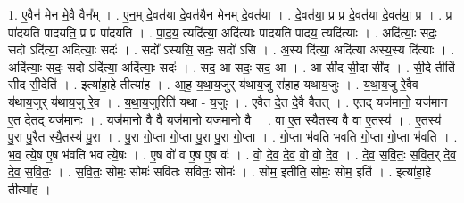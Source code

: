 \documentclass[17pt]{extarticle}
\begin{document}
1. ए॒वैन॑ मेन मे॒वै वैन᳚म् । . ए॒न॒म् दे॒वत॑या दे॒वत॑यैन मेनम् दे॒वत॑या । . दे॒वत॑या॒ प्र प्र दे॒वत॑या दे॒वत॑या॒ प्र । . प्र पा॑दयति पादयति॒ प्र प्र पा॑दयति । . पा॒द॒य॒ त्यदि॑त्या॒ अदि॑त्याः पादयति पादय॒ त्यदि॑त्याः । . अदि॑त्याः॒ सदः॒ सदो ऽदि॑त्या॒ अदि॑त्याः॒ सदः॑ । . सदो᳚ ऽस्यसि॒ सदः॒ सदो॑ ऽसि । . अ॒स्य दि॑त्या॒ अदि॑त्या अस्य॒स्य दि॑त्याः । . अदि॑त्याः॒ सदः॒ सदो ऽदि॑त्या॒ अदि॑त्याः॒ सदः॑ । . सद॒ आ सदः॒ सद॒ आ । . आ सी॑द सी॒दा सी॑द । . सी॒दे तीति॑ सीद सी॒देति॑ । . इत्या॑हा॒हे तीत्या॑ह । . आ॒ह॒ य॒था॒य॒जुर् य॑थाय॒जु रा॑हाह यथाय॒जुः । . य॒था॒य॒जु रे॒वैव य॑थाय॒जुर् य॑थाय॒जु रे॒व । . य॒था॒य॒जुरिति॑ यथा - य॒जुः । . ए॒वैत दे॒त दे॒वै वैतत् । . ए॒तद् यज॑मानो॒ यज॑मान ए॒त दे॒तद् यज॑मानः । . यज॑मानो॒ वै वै यज॑मानो॒ यज॑मानो॒ वै । . वा ए॒त स्यै॒तस्य॒ वै वा ए॒तस्य॑ । . ए॒तस्य॑ पु॒रा पु॒रैत स्यै॒तस्य॑ पु॒रा । . पु॒रा गो॒प्ता गो॒प्ता पु॒रा पु॒रा गो॒प्ता । . गो॒प्ता भ॑वति भवति गो॒प्ता गो॒प्ता भ॑वति । . भ॒व॒ त्ये॒ष ए॒ष भ॑वति भव त्ये॒षः । . ए॒ष वो॑ व ए॒ष ए॒ष वः॑ । . वो॒ दे॒व॒ दे॒व॒ वो॒ वो॒ दे॒व॒ । . दे॒व॒ स॒वि॒तः॒ स॒वि॒त॒र् दे॒व॒ दे॒व॒ स॒वि॒तः॒ । . स॒वि॒तः॒ सोमः॒ सोमः॑ सवितः सवितः॒ सोमः॑ । . सोम॒ इतीति॒ सोमः॒ सोम॒ इति॑ । . इत्या॑हा॒हे तीत्या॑ह । \newline
\end{document}
